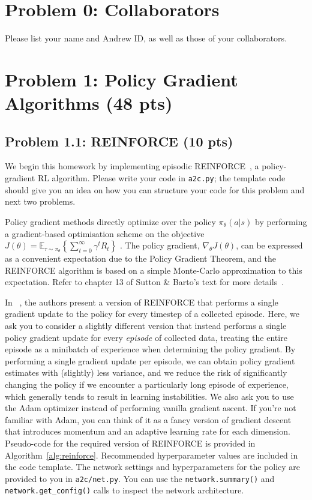 \documentclass[12pt]{article}
\begin{document}
\section*{Problem 0: Collaborators}
Please list your name and Andrew ID, as well as those of your collaborators.

\section*{Problem 1: Policy Gradient Algorithms (48 pts)}


\subsection*{Problem 1.1: REINFORCE (10 pts)}
 
We begin this homework by implementing episodic REINFORCE~\cite{reinforce}, a policy-gradient RL algorithm. Please write your code in \texttt{a2c.py}; the template code should give you an idea on how you can structure your code for this problem and next two problems.

Policy gradient methods directly optimize over the policy $\pi_\theta( a | s)$ by performing a gradient-based optimisation scheme on the objective $J(\theta) = \mathbb{E}_{\tau \sim \pi_\theta}\left\{\sum_{t=0}^\infty \gamma^t R_t\right\}$ . The policy gradient, $\nabla_\theta J(\theta)$, can be expressed as a convenient expectation due to the Policy Gradient Theorem, and the REINFORCE algorithm is based on a simple Monte-Carlo approximation to this expectation. Refer to chapter 13 of Sutton \& Barto's text for more details~\cite{sutton2018reinforcement}.

In ~\cite{sutton2018reinforcement}, the authors present a version of REINFORCE that performs a single gradient update to the policy for every timestep of a collected episode. Here, we ask you to consider a slightly different version that instead performs a single policy gradient update for every \textit{episode} of collected data, treating the entire episode as a minibatch of experience when determining the policy gradient. By performing a single gradient update per episode, we can obtain policy gradient estimates with (slightly) less variance, and we reduce the risk of significantly changing the policy if we encounter a particularly long episode of experience, which generally tends to result in learning instabilities. We also ask you to use the Adam optimizer instead of performing vanilla gradient ascent. If you're not familiar with Adam, you can think of it as a fancy version of gradient descent that introduces momentum and an adaptive learning rate for each dimension. Pseudo-code for the required version of REINFORCE is provided in Algorithm~\ref{alg:reinforce}. Recommended hyperparameter values are included in the code template. The network settings and hyperparameters for the policy are provided to you in \texttt{a2c/net.py}. You can use the \texttt{network.summary()} and \texttt{network.get\_config()} calls to inspect the network architecture.
\end{document}
